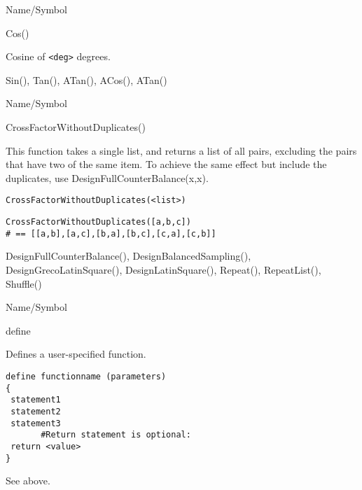 \rl


\begin{desc}{Name/Symbol}
\item[Name/Symbol]  	Cos()
			 
\item[Description] 	Cosine of \verb+<deg>+ degrees.

\item[Usage]		

\item[Example]	

\item[See Also]     	Sin(), Tan(), ATan(), ACos(), ATan() 
\end{desc}

\rl


\begin{desc}{Name/Symbol}
\item[Name/Symbol]  	CrossFactorWithoutDuplicates()

\item[Description] 	This function takes a single list, and returns a list of all 
			pairs, excluding the pairs that have two of the same item. 
			To achieve the same effect but include the duplicates, use 
			DesignFullCounterBalance(x,x).

\item[Usage]
\begin{verbatim}
CrossFactorWithoutDuplicates(<list>)
\end{verbatim}

\item[Example]
\begin{verbatim}
CrossFactorWithoutDuplicates([a,b,c]) 
# == [[a,b],[a,c],[b,a],[b,c],[c,a],[c,b]]
\end{verbatim}

\item[See Also]     	DesignFullCounterBalance(), DesignBalancedSampling(),
  		DesignGrecoLatinSquare(), DesignLatinSquare(), Repeat(),
  		RepeatList(), Shuffle()
\end{desc}

\rl


\begin{desc}{Name/Symbol}
\item[Name/Symbol]  	define

\item[Description]  	Defines a user-specified function.

\item[Usage]
\begin{verbatim}
define functionname (parameters)
{
 statement1
 statement2
 statement3
       #Return statement is optional:
 return <value>
}
\end{verbatim}

\item[Example]    	See above.

\item[See Also]
\end{desc}   	



